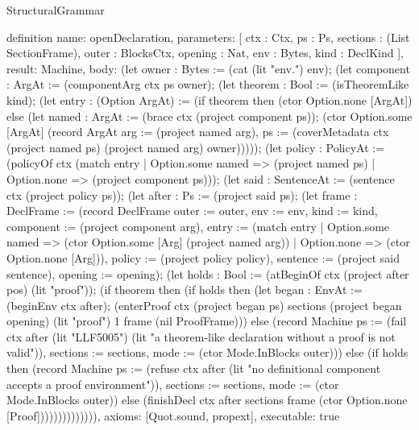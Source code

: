 \begin{lexlean}{StructuralGrammar}
\begin{semanticmodule}
{{definition{
  name: openDeclaration,
  parameters: [
    ctx : Ctx,
    ps : Ps,
    sections : (List SectionFrame),
    outer : BlocksCtx,
    opening : Nat,
    env : Bytes,
    kind : DeclKind
  ],
  result: Machine,
  body: (let owner : Bytes := (cat (lit "env.") env); (let component : ArgAt := (componentArg ctx ps owner); (let theorem : Bool := (isTheoremLike kind); (let entry : (Option ArgAt) := (if theorem then (ctor Option.none [ArgAt]) else (let named : ArgAt := (brace ctx (project component ps)); (ctor Option.some [ArgAt] (record ArgAt {arg := (project named arg), ps := (coverMetadata ctx (project named ps) (project named arg) owner)})))); (let policy : PolicyAt := (policyOf ctx (match entry
    | Option.some named => (project named ps)
    | Option.none => (project component ps))); (let said : SentenceAt := (sentence ctx (project policy ps)); (let after : Ps := (project said ps); (let frame : DeclFrame := (record DeclFrame {outer := outer, env := env, kind := kind, component := (project component arg), entry := (match entry
    | Option.some named => (ctor Option.some [Arg] (project named arg))
    | Option.none => (ctor Option.none [Arg])), policy := (project policy policy), sentence := (project said sentence), opening := opening}); (let holds : Bool := (atBeginOf ctx (project after pos) (lit "proof")); (if theorem then (if holds then (let began : EnvAt := (beginEnv ctx after); (enterProof ctx (project began ps) sections (project began opening) (lit "proof") 1 frame (nil ProofFrame))) else (record Machine {ps := (fail ctx after (lit "LLF5005") (lit "a theorem-like declaration without a proof is not valid")), sections := sections, mode := (ctor Mode.InBlocks outer)})) else (if holds then (record Machine {ps := (refuse ctx after (lit "no definitional component accepts a proof environment")), sections := sections, mode := (ctor Mode.InBlocks outer)}) else (finishDecl ctx after sections frame (ctor Option.none [Proof]))))))))))))),
  axioms: [Quot.sound, propext],
  executable: true
}

}}
\end{semanticmodule}
\end{lexlean}
